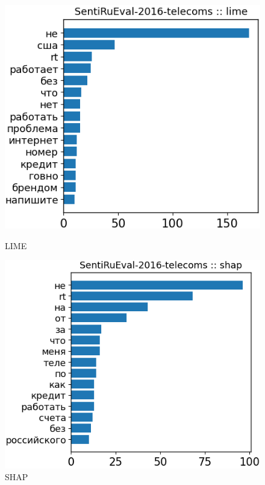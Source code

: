 \begin{itemize}
\begin{figure}[H]
\centering
\begin{minipage}[b]{0.49\textwidth}
\centering
\includegraphics[width=\textwidth]{pictures/examples_telecoms/dct3.png} %
\caption{LIME}
\end{minipage}
\hfill
\begin{minipage}[b]{0.49\textwidth}
\centering
\includegraphics[width=\textwidth]{pictures/examples_telecoms/dct4.png} %
\caption{SHAP}
\end{minipage}
\end{figure}


\end{itemize}
